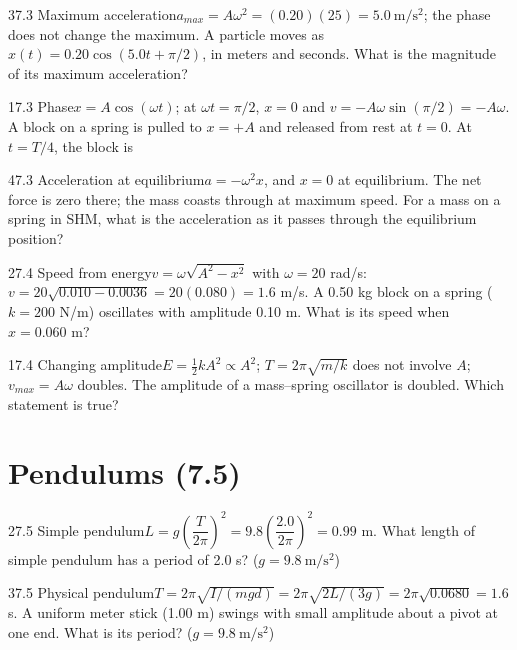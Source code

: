 \documentclass[11pt]{article}
\begin{document}
\begin{q}{3}{7.3 Maximum acceleration}{$a_{max} = A\omega^2 = (0.20)(25) = 5.0\ \mathrm{m/s^2}$; the phase does not change the maximum.}
A particle moves as $x(t) = 0.20\cos(5.0t + \pi/2)$, in meters and seconds. What is the magnitude of its maximum acceleration?
\end{q}
\begin{q}{1}{7.3 Phase}{$x = A\cos(\omega t)$; at $\omega t = \pi/2$, $x = 0$ and $v = -A\omega\sin(\pi/2) = -A\omega$.}
A block on a spring is pulled to $x = +A$ and released from rest at $t = 0$. At $t = T/4$, the block is
\end{q}
\begin{q}{4}{7.3 Acceleration at equilibrium}{$a = -\omega^2 x$, and $x = 0$ at equilibrium. The net force is zero there; the mass coasts through at maximum speed.}
For a mass on a spring in SHM, what is the acceleration as it passes through the equilibrium position?
\end{q}
\begin{q}{2}{7.4 Speed from energy}{$v = \omega\sqrt{A^2 - x^2}$ with $\omega = 20$ rad/s: $v = 20\sqrt{0.010 - 0.0036} = 20(0.080) = 1.6$ m/s.}
A 0.50 kg block on a spring ($k = 200$ N/m) oscillates with amplitude 0.10 m. What is its speed when $x = 0.060$ m?
\end{q}
\begin{q}{1}{7.4 Changing amplitude}{$E = \tfrac12 kA^2 \propto A^2$; $T = 2\pi\sqrt{m/k}$ does not involve $A$; $v_{max} = A\omega$ doubles.}
The amplitude of a mass--spring oscillator is doubled. Which statement is true?
\end{q}

\section{Pendulums (7.5)}

\begin{q}{2}{7.5 Simple pendulum}{$L = g\left(\dfrac{T}{2\pi}\right)^2 = 9.8\left(\dfrac{2.0}{2\pi}\right)^2 = 0.99$ m.}
What length of simple pendulum has a period of 2.0 s? ($g = 9.8\ \mathrm{m/s^2}$)
\end{q}
\begin{q}{3}{7.5 Physical pendulum}{$T = 2\pi\sqrt{I/(mgd)} = 2\pi\sqrt{2L/(3g)} = 2\pi\sqrt{0.0680} = 1.6$ s.}
A uniform meter stick (1.00 m) swings with small amplitude about a pivot at one end. What is its period? ($g = 9.8\ \mathrm{m/s^2}$)
\end{q}
\end{document}

